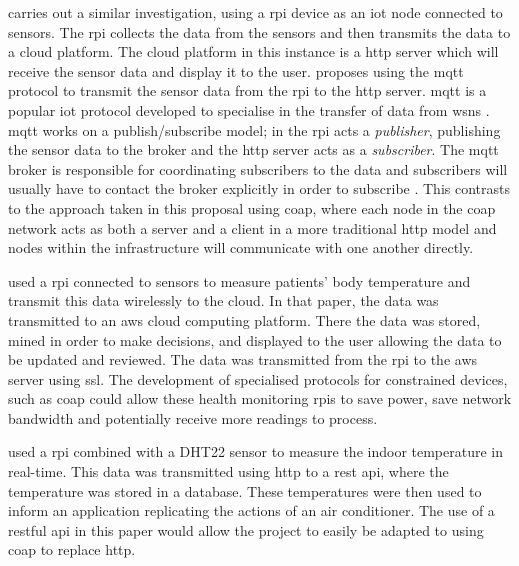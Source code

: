\citet{rode_iot_2017} carries out a similar investigation, using a \gls{rpi} 
device as an \gls{iot} node connected to sensors. The \gls{rpi} collects the 
data from the sensors and then transmits the data to a cloud platform. The 
cloud platform in this instance is a \gls{http} server which will receive the
sensor data and display it to the user. \citet{rode_iot_2017} proposes using the 
\gls{mqtt} protocol to transmit the sensor data from the \gls{rpi} to the
\gls{http} server.
\gls{mqtt} is a popular \gls{iot} protocol developed to specialise in the transfer
of data from \glspl{wsn} \citep{hunkeler_mqtt-s_2008}. \gls{mqtt} works on a 
publish/subscribe model; in \citet{rode_iot_2017} the \gls{rpi} acts a \textit{publisher}, 
publishing the sensor data to the broker and the \gls{http} server acts as a
\textit{subscriber}. The \gls{mqtt} broker is responsible for coordinating subscribers 
to the data and subscribers will usually have to contact the broker explicitly in 
order to subscribe \citep{hunkeler_mqtt-s_2008}.
This contrasts to the approach taken in this proposal using \gls{coap}, where each
node in the \gls{coap} network acts as both a server and a client in a more traditional
\gls{http} model and nodes within the infrastructure will communicate with one
another directly.

\citet{jassas_smart_2015} used a \gls{rpi} connected to sensors to measure 
patients' body temperature and transmit this data wirelessly to the cloud.
In that paper, the data was transmitted to an \gls{aws} cloud computing platform.
There the data was stored, mined in order to make decisions, 
and displayed to the user allowing the data to be updated and reviewed.
The data was transmitted from the \gls{rpi} to the \gls{aws} server using \gls{ssl}.
The development of specialised protocols for constrained devices, such as \gls{coap}
could allow these health monitoring \glspl{rpi} to save power,
save network bandwidth and potentially receive more readings to process.

\citet{lee_internet_2018} used a \gls{rpi} combined with a DHT22 sensor to measure
the indoor temperature in real-time. This data was transmitted using \gls{http}
to a \gls{rest} \gls{api}, where the temperature was stored in a database.
These temperatures were then used to inform an application replicating 
the actions of an air conditioner. The use of a \gls{rest}ful \gls{api} in 
this paper would allow the project to easily be adapted to using \gls{coap} 
to replace \gls{http}.